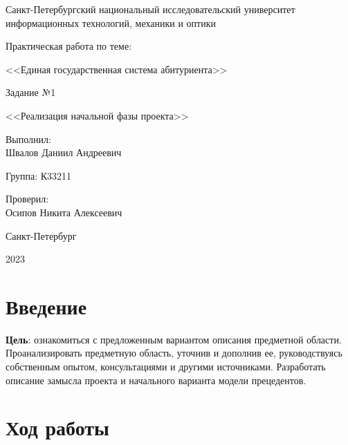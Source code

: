 \documentclass[a4paper, 14pt]{extarticle}
\begin{document}
\begin{titlepage}
  \vspace{0pt plus2fill}
  \noindent

  \vspace{0pt plus6fill}
  \begin{center}
    Санкт-Петербургский национальный исследовательский университет
    информационных технологий, механики и оптики

    \vspace{0pt plus2fill}

    Практическая работа по теме:

    <<Единая государственная система абитуриента>>

    \vspace{0pt plus1fill}

    Задание №1

    <<Реализация начальной фазы проекта>>

  \end{center}

  \vspace{0pt plus7fill}
  \begin{flushright}
    Выполнил: \\
    Швалов Даниил Андреевич

    Группа: К33211

    Проверил: \\
    Осипов Никита Алексеевич
  \end{flushright}

  \vspace{0pt plus2fill}
  \begin{center}
    Санкт-Петербург

    2023
  \end{center}
\end{titlepage}

\setcounter{page}{2}

\section{Введение}

\textbf{Цель}: ознакомиться с предложенным вариантом описания предметной
области. Проанализировать предметную область, уточнив и дополнив ее,
руководствуясь собственным опытом, консультациями и другими источниками.
Разработать описание замысла проекта и начального варианта модели прецедентов.

\section{Ход работы}
\end{document}
